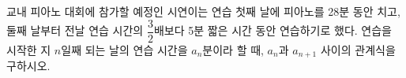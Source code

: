 교내 피아노 대회에 참가할 예정인 시연이는 연습 첫째 날에 피아노를 28분 동안 치고, 둘째 날부터 전날 연습 시간의 $\dfrac{3}{2}$배보다 5분 짧은 시간 동안 연습하기로 했다. 연습을 시작한 지 $n$일째 되는 날의 연습 시간을 $a_n$분이라 할 때, $a_n$과 $a_{n+1}$ 사이의 관계식을 구하시오.

